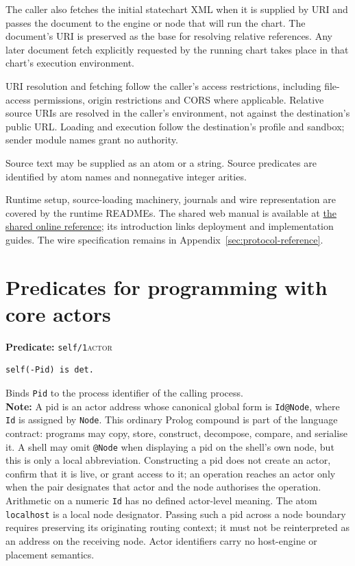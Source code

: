 The caller also fetches the initial statechart XML when it is supplied by URI
and passes the document to the engine or node that will run the chart. The
document's URI is preserved as the base for resolving relative references.
Any later document fetch explicitly requested by the running chart takes
place in that chart's execution environment.

URI resolution and fetching follow the caller's access restrictions,
including file-access permissions, origin restrictions and CORS where
applicable. Relative source URIs are resolved in the caller's environment,
not against the destination's public URL. Loading and execution follow the
destination's profile and sandbox; sender module names grant no authority.

Source text may be supplied as an atom or a string. Source predicates are
identified by atom names and nonnegative integer arities.

Runtime setup, source-loading machinery, journals and wire representation are
covered by the runtime READMEs. The shared web manual is available at
\href{https://github.com/torbjornlager/trinity-demonstrator/blob/main/web/manual.html}{the shared online reference};
its introduction links deployment and implementation guides.
The wire specification remains in Appendix~\ref{sec:protocol-reference}.

\section{Predicates for programming with core actors}\label{sec:actor-API}

\noindent \textbf{Predicate:} \texttt{self/\allowbreak{}1}\hfill\textsc{actor}

\begin{verbatim}
self(-Pid) is det.
\end{verbatim}

\noindent Binds \texttt{Pid} to the process identifier of the calling process.\\

\smallskip
\noindent \textbf{Note:} A pid is an actor address whose canonical global form
is \texttt{Id@Node}, where \texttt{Id} is assigned by \texttt{Node}. This
ordinary Prolog compound is part of the language contract: programs may copy,
store, construct, decompose, compare, and serialise it. A shell may omit
\texttt{@Node} when displaying a pid on the shell's own node, but this is only
a local abbreviation. Constructing a pid does not create an actor, confirm
that it is live, or grant access to it; an operation reaches an actor only when
the pair designates that actor and the node authorises the operation.
Arithmetic on a numeric \texttt{Id} has no defined actor-level meaning.
The atom \texttt{localhost} is a local node designator. Passing such a pid
across a node boundary requires preserving its originating routing context;
it must not be reinterpreted as an address on the receiving node. Actor
identifiers carry no host-engine or placement semantics.\\

